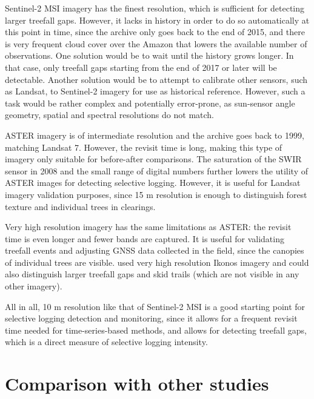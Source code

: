 \documentclass[a4paper,12pt]{scrbook}
\begin{document}
Sentinel-2 \ac{MSI} imagery has the finest resolution, which is sufficient for detecting larger treefall gaps. However, it lacks in history in order to do so automatically at this point in time, since the archive only goes back to the end of 2015, and there is very frequent cloud cover over the Amazon that lowers the available number of observations. One solution would be to wait until the history grows longer. In that case, only treefall gaps starting from the end of 2017 or later will be detectable. Another solution would be to attempt to calibrate other sensors, such as Landsat, to Sentinel-2 imagery for use as historical reference. However, such a task would be rather complex and potentially error-prone, as sun-sensor angle geometry, spatial and spectral resolutions do not match.

\ac{ASTER} imagery is of intermediate resolution and the archive goes back to 1999, matching Landsat 7. However, the revisit time is long, making this type of imagery only suitable for before-after comparisons. The saturation of the \ac{SWIR} sensor in 2008 and the small range of digital numbers further lowers the utility of \ac{ASTER} images for detecting selective logging. However, it is useful for Landsat imagery validation purposes, since 15 m resolution is enough to distinguish forest texture and individual trees in clearings.

Very high resolution imagery has the same limitations as \ac{ASTER}: the revisit time is even longer and fewer bands are captured. It is useful for validating treefall events and adjusting \ac{GNSS} data collected in the field, since the canopies of individual trees are visible. \citet{read_spatial_2003} used very high resolution Ikonos imagery and could also distinguish larger treefall gaps and skid trails (which are not visible in any other imagery).

All in all, 10 m resolution like that of Sentinel-2 \ac{MSI} is a good starting point for selective logging detection and monitoring, since it allows for a frequent revisit time needed for time-series-based methods, and allows for detecting treefall gaps, which is a direct measure of selective logging intensity.

\section{Comparison with other studies}
\end{document}

